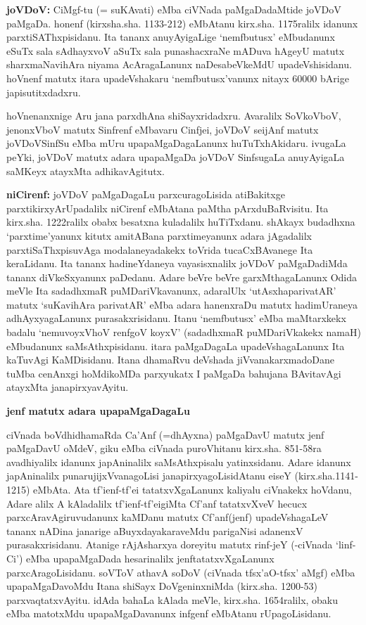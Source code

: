 {\bf joVDoV:} CiMgf-tu (= suKAvati) eMba ciVNada paMgaDadaMtide joVDoV paMgaDa. honenf (kirxsha.sha. 1133-212) eMbAtanu kirx.sha. 1175ralilx idanunx parxtiSAThxpisidanu. Ita tananx anuyAyigaLige `nemfbutusx' eMbudanunx eSuTx sala sAdhayxvoV aSuTx sala punashacxraNe mADuva hAgeyU matutx sharxmaNavihAra niyama AcAragaLanunx naDesabeVkeMdU upadeVshisidanu. hoVnenf matutx itara upadeVshakaru `nemfbutusx'vanunx nitayx 60000 bArige japisutitxdadxru.

hoVnenanxnige Aru jana parxdhAna shiSayxridadxru. Avaralilx SoVkoVboV, jenonxVboV matutx Sinfrenf eMbavaru Cinfjei, joVDoV seijAnf matutx joVDoVSinfSu eMba mUru upapaMgaDagaLanunx huTuTxhAkidaru. ivugaLa peYki, joVDoV matutx adara upapaMgaDa joVDoV SinfsugaLa anuyAyigaLa saMKeyx atayxMta adhikavAgitutx.

{\bf niCirenf:} joVDoV paMgaDagaLu parxcuragoLisida atiBakitxge parxtikirxyArUpadalilx niCirenf eMbAtana paMtha pArxduBaRvisitu. Ita kirx.sha. 1222ralilx obabx besatxna kuladalilx huTiTxdanu. shAkayx budadhxna `parxtime'yanunx kitutx amitABana parxtimeyanunx adara jAgadalilx parxtiSaThxpisuvAga modalaneyadakekx toVrida tucaCxBAvanege Ita keraLidanu. Ita tananx hadineYdaneya vayasisxnalilx joVDoV paMgaDadiMda tananx diVkeSxyanunx paDedanu. Adare beVre beVre garxMthagaLanunx Odida meVle Ita sadadhxmaR puMDariVkavanunx, adaralUlx `utAsxhaparivatAR' matutx `suKavihAra parivatAR' eMba adara hanenxraDu matutx hadimUraneya adhAyxyagaLanunx purasakxrisidanu. Itanu `nemfbutusx' eMba maMtarxkekx badalu `nemuvoyxVhoV renfgoV koyxV' (sadadhxmaR puMDariVkakekx namaH) eMbudanunx saMsAthxpisidanu. itara paMgaDagaLa upadeVshagaLanunx Ita kaTuvAgi KaMDisidanu. Itana dhamaRvu deVshada jiVvanakarxmadoDane tuMba cenAnxgi hoMdikoMDa parxyukatx I paMgaDa bahujana BAvitavAgi atayxMta janapirxyavAyitu.

\begin{center}
{\textbf{\Large jenf matutx adara upapaMgaDagaLu}}
\end{center}

ciVnada boVdhidhamaRda Ca'Anf (=dhAyxna) paMgaDavU matutx jenf paMga\-DavU oMdeV, giku eMba ciVnada puroVhitanu kirx.sha. 851-58ra avadhiyalilx idanunx japAninalilx saMsAthxpisalu yatinxsidanu. Adare idanunx japAninalilx punarujijxVvanagoLisi janapirxyagoLisidAtanu eiseY (kirx.sha.1141-1215) eMbAta. Ata tf'ienf-\-tf'ei tatatxvXgaLanunx kaliyalu ciVnakekx hoVdanu, Adare alilx A kAladalilx tf'ienf-\-tf'eigiMta Cf'anf tatatxvXveV hecucx parxcAravAgiruvudanunx kaMDanu matutx Cf'anf\-(jenf) upadeVshagaLeV tananx nADina janarige aBuyxdayakaraveMdu parigaNisi adanenxV purasakxrisidanu. Atanige rAjAsharxya doreyitu matutx rinf-jeY (-ciVnada `linf-\-Ci') eMba upapaMgaDada hesarinalilx jenftatatxvXgaLanunx parxcAragoLisidanu. soVToV athavA soDoV (ciVnada tfsx'aO-tfsx' aMgf) eMba upapaMgaDavoMdu Itana shiSayx DoVgeninxniMda (kirx.sha. 1200-53) parxvaqtatxvAyitu. idAda bahaLa kAlada meVle, kirx.sha. 1654ralilx, obaku eMba matotxMdu upapaMgaDavanunx infgenf eMbAtanu rUpagoLisidanu. 

